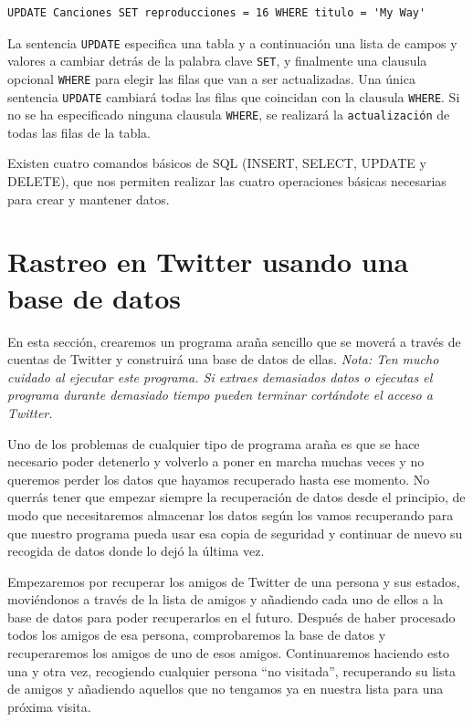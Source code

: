 \beforeverb
\begin{verbatim}
UPDATE Canciones SET reproducciones = 16 WHERE titulo = 'My Way'
\end{verbatim}
\afterverb
%
La sentencia {\tt UPDATE} especifica una tabla y a continuación
una lista de campos y valores a cambiar detrás de la palabra
clave {\tt SET}, y finalmente una clausula opcional {\tt WHERE} para elegir
las filas que van a ser actualizadas. Una única sentencia {\tt UPDATE}
cambiará todas las filas que coincidan con la clausula {\tt WHERE}.
Si no se ha especificado ninguna clausula {\tt WHERE}, se realizará la
{\tt actualización} de todas las filas de la tabla.

Existen cuatro comandos básicos de SQL (INSERT, SELECT, UPDATE y DELETE), que
nos permiten realizar las cuatro operaciones básicas necesarias para crear y mantener datos.

\section{Rastreo en Twitter usando una base de datos}

En esta sección, crearemos un programa araña sencillo que se moverá
a través de cuentas de Twitter y construirá una base de datos de ellas.
\emph{Nota: Ten mucho cuidado al ejecutar este programa. Si extraes
demasiados datos o ejecutas el programa durante demasiado tiempo
pueden terminar cortándote el acceso a Twitter.}

Uno de los problemas de cualquier tipo de programa araña es que se
hace necesario poder detenerlo y volverlo a poner en marcha muchas veces y
no queremos perder los datos que hayamos recuperado hasta ese momento.
No querrás tener que empezar siempre la recuperación de datos desde
el principio, de modo que necesitaremos almacenar los datos según los vamos recuperando para
que nuestro programa pueda usar esa copia de seguridad y continuar de nuevo su recogida de datos
donde lo dejó la última vez.

Empezaremos por recuperar los amigos de Twitter de una persona y sus estados,
moviéndonos a través de la lista de amigos y añadiendo cada uno de ellos
a la base de datos para poder recuperarlos en el futuro. Después
de haber procesado todos los amigos de esa persona, comprobaremos la base de datos
y recuperaremos los amigos de uno de esos amigos. Continuaremos haciendo esto una y otra vez,
recogiendo cualquier persona ``no visitada'', recuperando su lista de amigos
y añadiendo aquellos que no tengamos ya en nuestra lista para una próxima visita.


